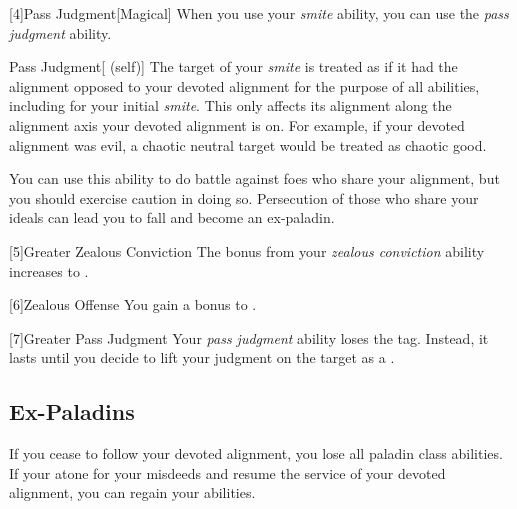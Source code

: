         [4]{Pass Judgment}[Magical] When you use your \textit{smite} ability, you can use the \textit{pass judgment} ability.
        \begin{attuneability}{Pass Judgment}[ (self)]
            The target of your \textit{smite} is treated as if it had the alignment opposed to your devoted alignment for the purpose of all abilities, including for your initial \textit{smite}.
            This only affects its alignment along the alignment axis your devoted alignment is on.
            For example, if your devoted alignment was evil, a chaotic neutral target would be treated as chaotic good.

            You can use this ability to do battle against foes who share your alignment, but you should exercise caution in doing so.
            Persecution of those who share your ideals can lead you to fall and become an ex-paladin.
        \end{attuneability}

        [5]{Greater Zealous Conviction} The bonus from your \textit{zealous conviction} ability increases to .

        [6]{Zealous Offense} You gain a  bonus to .

        [7]{Greater Pass Judgment} Your \textit{pass judgment} ability loses the  tag.
        Instead, it lasts until you decide to lift your judgment on the target as a .


    \subsection{Ex-Paladins}
        If you cease to follow your devoted alignment, you lose all  paladin class abilities.
        If your atone for your misdeeds and resume the service of your devoted alignment, you can regain your abilities.

